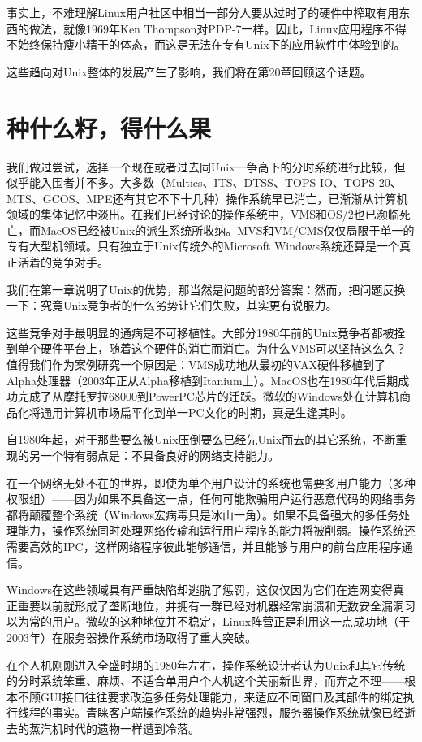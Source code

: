 \documentclass[12pt,oneside]{book}
\begin{document}
事实上，不难理解Linux用户社区中相当一部分人要从过时了的硬件中榨取有用东西的做法，就像1969年Ken Thompson对PDP-7一样。因此，Linux应用程序不得不始终保持瘦小精干的体态，而这是无法在专有Unix下的应用软件中体验到的。

这些趋向对Unix整体的发展产生了影响，我们将在第20章回顾这个话题。


\section{种什么籽，得什么果}
我们做过尝试，选择一个现在或者过去同Unix一争高下的分时系统进行比较，但似乎能入围者并不多。大多数（Multics、ITS、DTSS、TOPS-IO、TOPS-20、MTS、GCOS、MPE还有其它不下十几种）操作系统早已消亡，已渐渐从计算机领域的集体记忆中淡出。在我们已经讨论的操作系统中，VMS和OS/2也已濒临死亡，而MacOS已经被Unix的派生系统所收纳。MVS和VM/CMS仅仅局限于单一的专有大型机领域。只有独立于Unix传统外的Microsoft Windows系统还算是一个真正活着的竞争对手。

我们在第一章说明了Unix的优势，那当然是问题的部分答案：然而，把问题反换一下：究竟Unix竞争者的什么劣势让它们失败，其实更有说服力。

这些竞争对手最明显的通病是不可移植性。大部分1980年前的Unix竞争者都被拴到单个硬件平台上，随着这个硬件的消亡而消亡。为什么VMS可以坚持这么久？值得我们作为案例研究一个原因是：VMS成功地从最初的VAX硬件移植到了Alpha处理器（2003年正从Alpha移植到Itanium上）。MacOS也在1980年代后期成功完成了从摩托罗拉68000到PowerPC芯片的迁跃。微软的Windows处在计算机商品化将通用计算机市场扁平化到单一PC文化的时期，真是生逢其时。

自1980年起，对于那些要么被Unix压倒要么已经先Unix而去的其它系统，不断重现的另一个特有弱点是：不具备良好的网络支持能力。

在一个网络无处不在的世界，即使为单个用户设计的系统也需要多用户能力（多种权限组）——因为如果不具备这一点，任何可能欺骗用户运行恶意代码的网络事务都将颠覆整个系统（Windows宏病毒只是冰山一角）。如果不具备强大的多任务处理能力，操作系统同时处理网络传输和运行用户程序的能力将被削弱。操作系统还需要高效的IPC，这样网络程序彼此能够通信，并且能够与用户的前台应用程序通信。

Windows在这些领域具有严重缺陷却逃脱了惩罚，这仅仅因为它们在连网变得真正重要以前就形成了垄断地位，并拥有一群已经对机器经常崩溃和无数安全漏洞习以为常的用户。微软的这种地位并不稳定，Linux阵营正是利用这一点成功地（于2003年）在服务器操作系统市场取得了重大突破。

在个人机刚刚进入全盛时期的1980年左右，操作系统设计者认为Unix和其它传统的分时系统笨重、麻烦、不适合单用户个人机这个美丽新世界，而弃之不理——根本不顾GUI接口往往要求改造多任务处理能力，来适应不同窗口及其部件的绑定执行线程的事实。青睐客户端操作系统的趋势非常强烈，服务器操作系统就像已经逝去的蒸汽机时代的遗物一样遭到冷落。
\end{document}
